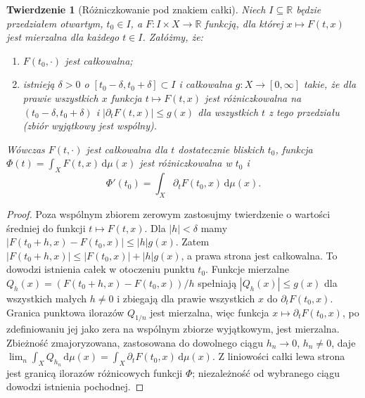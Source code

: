 \documentclass[11pt,a4paper,oneside]{book}
\numberwithin{equation}{chapter}
\theoremstyle{plain}
\newtheorem{twierdzenie}{Twierdzenie}[chapter]
\theoremstyle{definition}
\theoremstyle{remark}
\begin{document}
\begin{twierdzenie}[Różniczkowanie pod znakiem całki]
\label{thm:differentiating-integrals}
Niech $I\subseteq\mathbb R$ będzie przedziałem otwartym,
$t_0\in I$, a $F:I\times X\to\mathbb R$ funkcją,
dla której $x\mapsto F(t,x)$ jest mierzalna
dla każdego $t\in I$. Załóżmy, że:
\begin{enumerate}[label=\textup{(\roman*)}]
\item $F(t_0,\cdot)$ jest całkowalna;
\item istnieją $\delta>0$ o
$[t_0-\delta,t_0+\delta]\subset I$ i całkowalna
$g:X\to[0,\infty]$ takie, że dla prawie wszystkich
$x$ funkcja $t\mapsto F(t,x)$ jest różniczkowalna
na $(t_0-\delta,t_0+\delta)$ i
$|\partial_tF(t,x)|\le g(x)$ dla wszystkich $t$ z
tego przedziału (zbiór wyjątkowy jest wspólny).
\end{enumerate}
Wówczas $F(t,\cdot)$ jest całkowalna dla
$t$ dostatecznie bliskich $t_0$, funkcja
$\Phi(t)=\int_XF(t,x)\,\mathrm d\mu(x)$ jest
różniczkowalna w $t_0$ i
\begin{equation}\label{eq:differentiation-under-integral}
\Phi'(t_0)=\int_X\partial_tF(t_0,x)\,\mathrm d\mu(x).
\end{equation}
\end{twierdzenie}
\begin{proof}
Poza wspólnym zbiorem zerowym zastosujmy twierdzenie
o wartości średniej do funkcji $t\mapsto F(t,x)$.
Dla $|h|<\delta$ mamy
$|F(t_0+h,x)-F(t_0,x)|\le |h|g(x)$.
Zatem $|F(t_0+h,x)|\le|F(t_0,x)|+|h|g(x)$,
a prawa strona jest całkowalna. To dowodzi
istnienia całek w otoczeniu punktu $t_0$.
Funkcje mierzalne
$Q_h(x)=(F(t_0+h,x)-F(t_0,x))/h$ spełniają
$|Q_h(x)|\le g(x)$ dla wszystkich małych $h\ne0$
i zbiegają dla prawie wszystkich $x$ do
$\partial_tF(t_0,x)$. Granica punktowa ilorazów $Q_{1/n}$ jest mierzalna,
więc funkcja $x\mapsto\partial_tF(t_0,x)$,
po zdefiniowaniu jej jako zera na wspólnym zbiorze
wyjątkowym, jest mierzalna. Zbieżność zmajoryzowana,
zastosowana do dowolnego ciągu $h_n\to0$,
$h_n\ne0$, daje
$\lim_n\int_XQ_{h_n}\,\mathrm d\mu(x)
=\int_X\partial_tF(t_0,x)\,\mathrm d\mu(x)$.
Z liniowości całki lewa strona jest granicą
ilorazów różnicowych funkcji $\Phi$; niezależność
od wybranego ciągu dowodzi istnienia pochodnej.
\end{proof}
\end{document}
